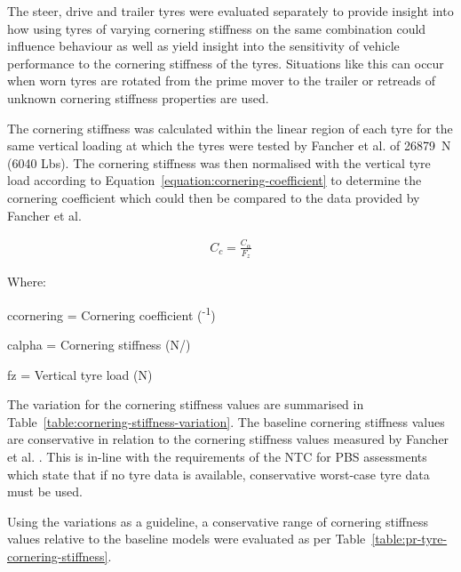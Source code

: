 The steer, drive and trailer tyres were evaluated separately to provide insight into how using tyres of varying cornering stiffness on the same combination could influence behaviour as well as yield insight into the sensitivity of vehicle performance to the cornering stiffness of the tyres. Situations like this can occur when worn tyres are rotated from the prime mover to the trailer or retreads of unknown cornering stiffness properties are used.

The cornering stiffness was calculated within the linear region of each tyre for the same vertical loading at which the tyres were tested by Fancher et al. of 26879~N (6040 Lbs). The cornering stiffness was then normalised with the vertical tyre load according to Equation~\ref{equation:cornering-coefficient} to determine the cornering coefficient which could then be compared to the data provided by Fancher et al.

\begin{align}
	\label{equation:cornering-coefficient}
	C_{c} = \frac{C_{\alpha{}}}{F_z}
\end{align}

Where:

\gls{ccornering} = Cornering coefficient (\degree{}\textsuperscript{-1})

\gls{calpha} = Cornering stiffness (N/\degree{})

\gls{fz} = Vertical tyre load (N)


The variation for the cornering stiffness values are summarised in Table~\ref{table:cornering-stiffness-variation}. The baseline cornering stiffness values are conservative in relation to the cornering stiffness values measured by Fancher et al. \cite{Fancher1986}. This is in-line with the requirements of the NTC for PBS assessments which state \cite{NationalTransportCommission2008} that if no tyre data is available, conservative worst-case tyre data must be used.

Using the variations as a guideline, a conservative range of cornering stiffness values relative to the baseline models were evaluated as per Table~\ref{table:pr-tyre-cornering-stiffness}. 

